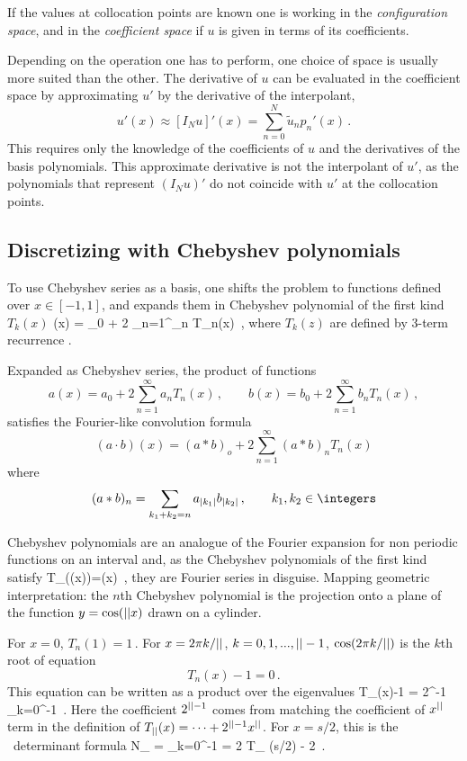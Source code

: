 If the values at collocation points are known one is working in the {\em
configuration space}, and in the {\em coefficient space} if $u$ is given
in terms of its coefficients.

Depending on the operation one has to perform, one choice of space is
usually more suited than the other. The derivative of $u$ can be
evaluated in the coefficient space by approximating
$u'$ by the derivative of the interpolant,
\[
u'(x) \approx [I_N u]'(x) = \sum_{n=0}^N \tilde{u}_n p_n'(x)
\,.
\]
This requires only the knowledge of the coefficients of
$u$ and the derivatives of the basis polynomials. This approximate derivative
is not the interpolant of $u'$, as the polynomials that represent
$(I_Nu)'$ do not coincide with $u'$ at the collocation points.

\subsection{Discretizing with Chebyshev polynomials}
\label{sect:ChebyshevPoly}

To use Chebyshev series as a basis, one shifts the problem to functions
defined over $x\in[-1,1]$, and expands them in {Chebyshev polynomial of the
first kind} $T_k(x)$
\beq
\field(x) = \field_0 + 2 \sum_{n=1}^\infty \field_n T_n(x)
\,,
where $T_k(z)$ are
defined by 3-term recurrence .

Expanded as Chebyshev series, the product of functions
\[
a(x) = a_0 + 2 \sum_{n=1}^\infty a_n T_n(x)
\,,\qquad
b(x) = b_0 + 2 \sum_{n=1}^\infty b_n T_n(x)
\,,
\]
satisfies the Fourier-like convolution formula
\[
(a\cdot b)(x) =(a*b)_o + 2 \sum_{n=1}^\infty(a*b)_n T_n(x)
\]
where
\[
(a*b)_n = \sum_{k_1+k_2= n}
          a_{|k_1|}b_{|k_2|}
\,,\qquad k_1,k_2\in\integers
\]

Chebyshev polynomials are an analogue of the Fourier expansion for non
periodic functions on an interval and, as the Chebyshev polynomials of
the first kind satisfy
\beq
T_{\cl{}}(\cos(x))=\cos(\cl{}x)
\,,
they are Fourier series in disguise.
Mapping  geometric interpretation: the $n$th
Chebyshev polynomial is the projection onto a plane of the function
$y =\cos({||}x)$ drawn on a cylinder.


For $x=0$, $T_n(1) = 1\,.$
For
$x=2\pi k/{||}$, $k=0,1,...,{||}-1$, $\cos(2\pi k/{||})$ is the $k$th
root of equation
\[
T_n(x)-1=0
\,.
\]
This equation can be written as a product over the eigenvalues
\beq
T_{\cl{}}(x)-1 =
2^{\cl{}-1} \prod_{k=0}^{\cl{}-1} 
\,.
Here the coefficient $2^{{||}-1}$ comes from matching the coefficient
of $x^{||}$ term in the definition of $T_{{||}}(x)=\cdots+2^{{||}-1} x^{||}$.
For $x={s}/2$, this is the \jacobianOrb\ determinant formula
\beq
N_\cl{}
 = \prod_{k=0}^{\cl{}-1} 
 = 2 T_{\cl{}} \left({s}/{2}\right) - 2
\,.

